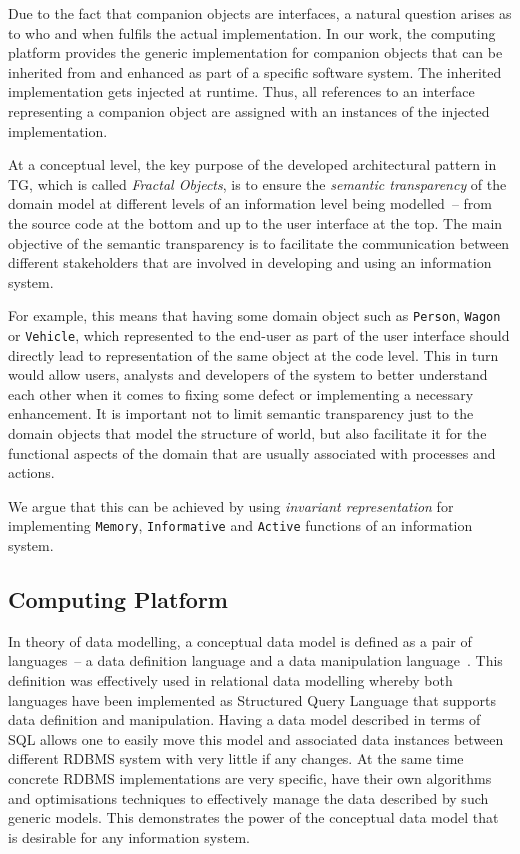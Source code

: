 \documentclass[a4paper,12pt,oneside,openright,final]{memoir} %
\begin{document}
    
  Due to the fact that companion objects are interfaces, a natural question arises as to who and when fulfils the actual implementation.
  In our work, the computing platform provides the generic implementation for companion objects that can be inherited from and enhanced as part of a specific software system.
  The inherited implementation gets injected at runtime.
  Thus, all references to an interface representing a companion object are assigned with an instances of the injected implementation.

	
	 

	At a conceptual level, the key purpose of the developed architectural pattern in TG, which is called \emph{Fractal Objects}, is to ensure the \emph{semantic transparency} of the domain model at different levels of an information level being modelled~-- from the source code at the bottom and up to the user interface at the top.
  	The main objective of the semantic transparency is to facilitate the communication between different stakeholders that are involved in developing and using an information system.

  	For example, this means that having some domain object such as \texttt{Person}, \texttt{Wagon} or \texttt{Vehicle}, which represented to the end-user as part of the user interface should directly lead to representation of the same object at the code level.
  	This in turn would allow users, analysts and developers of the system to better understand each other when it comes to fixing some defect or implementing a necessary enhancement.
  	It is important not to limit semantic transparency just to the domain objects that model the structure of world, but also facilitate it for the functional aspects of the domain that are usually associated with processes and actions.
  
	We argue that this can be achieved by using \emph{invariant representation} for implementing \texttt{Memory}, \texttt{Informative} and \texttt{Active} functions of an information system.
  
\subsection*{Computing Platform}

	In theory of data modelling, a conceptual data model is defined as a pair of languages~-- a data definition language and a data manipulation language~\cite{kal1983}.
  	This definition was effectively used in relational data modelling whereby both languages have been implemented as Structured Query Language that supports data definition and manipulation.
  	Having a data model described in terms of SQL allows one to easily move this model and associated data instances between different RDBMS system with very little if any changes.
  	At the same time concrete RDBMS implementations are very specific, have their own algorithms and optimisations techniques to effectively manage the data described by such generic models.
  	This demonstrates the power of the conceptual data model that is desirable for any information system.
  
\end{document}
